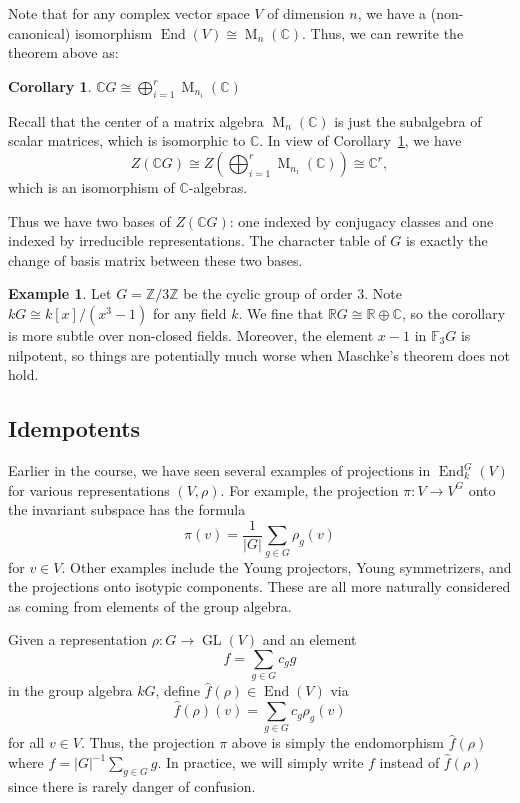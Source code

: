 \documentclass[12pt]{article}
\theoremstyle{plain}
\newtheorem{corollary}[theorem]{Corollary}
\theoremstyle{definition}
\newtheorem{example}[theorem]{Example}
\theoremstyle{remark}
\numberwithin{equation}{section}
\begin{document}
Note that for any complex vector space $V$ of dimension $n$, we have
a (non-canonical) isomorphism
$\operatorname{End}(V) \cong \operatorname{M}_n(\mathbb{C})$.
Thus, we can rewrite the theorem above as:  

\begin{corollary} \label{cor:fourier_as_matrices}
$\displaystyle
\mathbb{C}G \cong \bigoplus_{i=1}^r \operatorname{M}_{n_i}(\mathbb{C})$
\end{corollary}

Recall that the center of a matrix algebra
$\operatorname{M}_n(\mathbb{C})$ is just the subalgebra of scalar
matrices, which is isomorphic to $\mathbb{C}$.
In view of Corollary~\ref{cor:fourier_as_matrices},
we have
\[
Z(\mathbb{C}G) \cong Z\left( \bigoplus_{i=1}^r \operatorname{M}_{n_i}(\mathbb{C}) \right)
\cong \mathbb{C}^r,
\]
which is an isomorphism of $\mathbb{C}$-algebras.

Thus we have two bases of $Z(\mathbb{C}G)$: one indexed by conjugacy
classes and one indexed by irreducible representations.
The character table of $G$ is exactly the change of basis matrix between
these two bases.

\begin{example}
Let $G = \mathbb{Z}/3\mathbb{Z}$ be the cyclic group of order $3$.
Note $kG \cong k[x]/(x^3-1)$ for any field $k$.
We fine that $\mathbb{R}G \cong \mathbb{R} \oplus \mathbb{C}$,
so the corollary is more subtle over non-closed fields.
Moreover, the element $x-1$ in $\mathbb{F}_3G$ is nilpotent,
so things are potentially much worse when Maschke's theorem does not
hold.
\end{example}

\subsection{Idempotents}

Earlier in the course, we have seen several examples of projections in
$\operatorname{End}_k^G(V)$ for various representations $(V,\rho)$.
For example, the projection $\pi : V \to V^G$ onto the invariant
subspace has the formula
\[
\pi(v) = \frac{1}{|G|} \sum_{g \in G} \rho_g(v)
\]
for $v \in V$.
Other examples include the Young projectors, Young symmetrizers,
and the projections onto isotypic components.
These are all more naturally considered as coming from elements
of the group algebra.

Given a representation $\rho : G \to \operatorname{GL}(V)$
and an element
\[
f = \sum_{g \in G} c_g g
\]
in the group algebra $kG$,
define $\widehat{f}(\rho) \in \operatorname{End}(V)$ via
\[
\widehat{f}(\rho)(v) = \sum_{g \in G} c_g \rho_g(v)
\]
for all $v \in V$.
Thus, the projection $\pi$ above is simply the endomorphism
$\widehat{f}(\rho)$
where $f = |G|^{-1} \sum_{g \in G} g$.
In practice, we will simply write $f$ instead of $\widehat{f}(\rho)$
since there is rarely danger of confusion.
\end{document}
